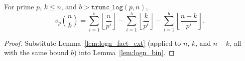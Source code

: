 \begin{lemma}
  \label{lem:logn_bin_via_sums}
  \rocqok
  For prime $p$, $k \leq n$, and $b > \texttt{trunc\_log}(p, n)$,
  \[
    v_p\!\binom{n}{k}
    = \sum_{i=1}^{b} \left\lfloor \frac{n}{p^i} \right\rfloor
    - \sum_{i=1}^{b} \left\lfloor \frac{k}{p^i} \right\rfloor
    - \sum_{i=1}^{b} \left\lfloor \frac{n-k}{p^i} \right\rfloor.
  \]
  \begin{proof}
    \rocqok
    Substitute Lemma~\ref{lem:logn_fact_ext} (applied to $n$, $k$,
    and $n-k$, all with the same bound $b$) into
    Lemma~\ref{lem:logn_bin}.
  \end{proof}
\end{lemma}

